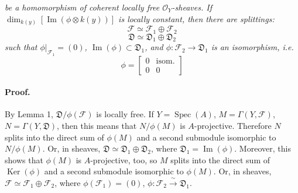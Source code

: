 

\DeclareMathOperator{\Ima}{Im}
\DeclareMathOperator{\Ker}{Ker}
\DeclareMathOperator{\Spec}{Spec}


\textit{be a homomorphism of coherent locally free $\mathcal{O}_Y$-sheaves.
If $\dim_{k(y)}[\Ima(\phi \otimes k(y))]$ is locally constant, then there are
splittings:}
\[
  \mathscr{F} \simeq \mathscr{F}_1 \oplus \mathscr{F}_2
\]
\[
  \mathfrak{D} \simeq \mathfrak{D}_1 \oplus \mathfrak{D}_2
\]
\textit{such that $\phi|_{\mathscr{F}_1} = (0)$,
$\Ima(\phi) \subset \mathfrak{D}_1$, and
$\phi : \mathscr{F}_2 \to \mathfrak{D}_1$ is an isomorphism, i.e.}
\[
  \phi =
  \begin{bmatrix}
    0 & \text{isom.} \\
    0 & 0
  \end{bmatrix}
\]

\paragraph{Proof.}
By Lemma 1, $\mathfrak{D}/\phi(\mathscr{F})$ is locally free. If
$Y = \Spec(A)$, $M = \Gamma(Y, \mathscr{F})$, $N = \Gamma(Y, \mathfrak{D})$,
then this means that $N/\phi(M)$ is $A$-projective. Therefore $N$ splits into
the direct sum of $\phi(M)$ and a second submodule isomorphic to
$N/\phi(M)$. Or, in sheaves, $\mathfrak{D} \simeq \mathfrak{D}_1 \oplus \mathfrak{D}_2$,
where $\mathfrak{D}_1 = \Ima(\phi)$. Moreover, this shows that $\phi(M)$ is
$A$-projective, too, so $M$ splits into the direct sum of $\Ker(\phi)$ and a
second submodule isomorphic to $\phi(M)$. Or, in sheaves,
$\mathscr{F} \simeq \mathscr{F}_1 \oplus \mathscr{F}_2$, where
$\phi(\mathscr{F}_1) = (0)$,
$\phi : \mathscr{F}_2 \xrightarrow{\ \sim\ } \mathfrak{D}_1$.


